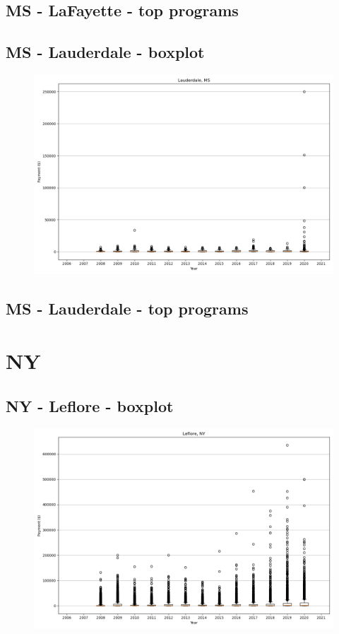 \subsection*{MS - LaFayette - top programs}

\newpage
\subsection*{MS - Lauderdale - boxplot}
\begin{figure}[h]
\centering
\includegraphics[width=7in]{../output/boxplots/counties/Lauderdale-MS_boxplot.png}
\end{figure}


\subsection*{MS - Lauderdale - top programs}

\newpage
\section*{NY}
\subsection*{NY - Leflore - boxplot}
\begin{figure}[h]
\centering
\includegraphics[width=7in]{../output/boxplots/counties/Leflore-NY_boxplot.png}
\end{figure}


